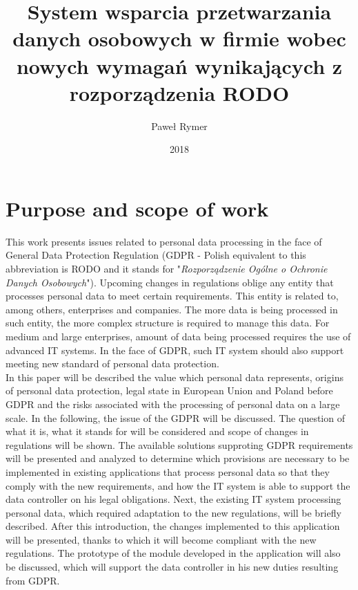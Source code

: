 \documentclass[en, noamssymb]{mgr}
\title{System wsparcia przetwarzania danych osobowych
w firmie wobec nowych wymagań wynikających z rozporządzenia RODO}
\author{Paweł Rymer}
\date{2018} %
\begin{document}

\maketitle %

\tableofcontents %

\chapter{Purpose and scope of work} \label{sec:sekcjaWprowadzenie}



This work presents issues related to personal data processing in the face of General Data Protection Regulation (GDPR - Polish equivalent to this abbreviation is RODO and it stands for "\textit{Rozporządzenie Ogólne o Ochronie Danych Osobowych}"). Upcoming changes in regulations oblige any entity that processes personal data to meet certain requirements. This entity is related to, among others, enterprises and companies. The more data is being processed in such entity, the more complex structure is required to manage this data. For medium and large enterprises, amount of data being processed requires the use of advanced IT systems. In the face of GDPR, such IT system should also support meeting new standard of personal data protection.\\
\indent In this paper will be described the value which personal data represents,  origins of personal data protection, legal state in European Union and Poland before GDPR and the risks associated with the processing of personal data on a large scale. In the following, the issue of the GDPR will be discussed. The question of what it is, what it stands for will be considered and scope of changes in regulations will be shown. The available solutions supproting GDPR requirements will be presented and analyzed to determine which provisions are necessary to be implemented in existing applications that process personal data so that they comply with the new requirements, and how the IT system is able to support the data controller on his legal obligations.
Next, the existing IT system processing personal data, which required adaptation to the new regulations, will be briefly described. After this introduction, the changes implemented to this application will be presented, thanks to which it will become compliant with the new regulations. The prototype of the module developed in the application will also be discussed, which will support the data controller in his new duties resulting from GDPR.
\end{document}

